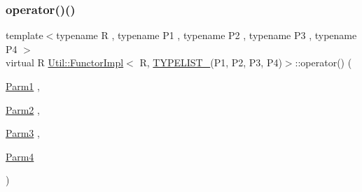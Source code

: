 \subsubsection{\texorpdfstring{operator()()}{operator()()}\hspace{0.1cm}{\footnotesize\ttfamily [1/2]}}
{\footnotesize\ttfamily template$<$typename R , typename P1 , typename P2 , typename P3 , typename P4 $>$ \\
virtual R \mbox{\hyperlink{classUtil_1_1FunctorImpl}{Util\+::\+Functor\+Impl}}$<$ R, \mbox{\hyperlink{install_2include_2adat_2typelist_8h_a7a156c571ab21a16b0495e1c882a07fa}{T\+Y\+P\+E\+L\+I\+S\+T\+\_}}(P1, P2, P3, P4)$>$\+::operator() (\begin{DoxyParamCaption}\item[{\mbox{\hyperlink{structUtil_1_1Private_1_1FunctorImplBase_a9d61e693d6c616dea5bd9d9073c7d21a}{Parm1}}}]{,  }\item[{\mbox{\hyperlink{structUtil_1_1Private_1_1FunctorImplBase_a554085cd798ef14838a59b528f0feb2e}{Parm2}}}]{,  }\item[{\mbox{\hyperlink{structUtil_1_1Private_1_1FunctorImplBase_a052148e627fd4caecbcffdbdf1033dbb}{Parm3}}}]{,  }\item[{\mbox{\hyperlink{structUtil_1_1Private_1_1FunctorImplBase_a1ad7fe3f243480c44a610927ebe76762}{Parm4}}}]{ }\end{DoxyParamCaption})\hspace{0.3cm}{\ttfamily [pure virtual]}}

\mbox{\label{classUtil_1_1FunctorImpl_3_01R_00_01TYPELIST__4_07P1_00_01P2_00_01P3_00_01P4_08_4_ad5c77ea15e9101b061099c9caaeba2be}} 
